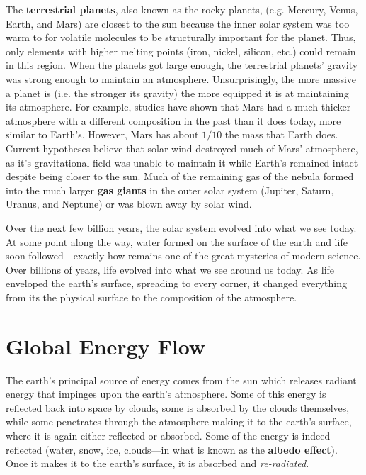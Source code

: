     The \textbf{terrestrial planets}, also known as the rocky planets, (e.g. Mercury, Venus, Earth, and Mars) are closest to the sun because the inner solar system was too warm to for volatile molecules to be structurally important for the planet. Thus, only elements with higher melting points (iron, nickel, silicon, etc.) could remain in this region. When the planets got large enough, the terrestrial planets' gravity was strong enough to maintain an atmosphere. Unsurprisingly, the more massive a planet is (i.e. the stronger its gravity) the more equipped it is at maintaining its atmosphere. For example, studies have shown that Mars had a much thicker atmosphere with a different composition in the past than it does today, more similar to Earth's. However, Mars has about $1/10$ the mass that Earth does. Current hypotheses believe that solar wind destroyed much of Mars' atmosphere, as it's gravitational field was unable to maintain it while Earth's remained intact despite being closer to the sun.\cite{owen1992composition} Much of the remaining gas of the nebula formed into the much larger \textbf{gas giants} in the outer solar system (Jupiter, Saturn, Uranus, and Neptune) or was blown away by solar wind.\cite{hayashi1985formation} 

    Over the next few billion years, the solar system evolved into what we see today. At some point along the way, water formed on the surface of the earth and life soon followed---exactly how remains one of the great mysteries of modern science. Over billions of years, life evolved into what we see around us today.\cite{bell2015potentially} As life enveloped the earth's surface, spreading to every corner, it changed everything from its the physical surface to the composition of the atmosphere.


    \section{\label{sec:energy_flow}Global Energy Flow}

    The earth's principal source of energy comes from the sun which releases radiant energy that impinges upon the earth's atmosphere.  Some of this energy is reflected back into space by clouds, some is absorbed by the clouds themselves, while some penetrates through the atmosphere making it to the earth's surface, where it is again either reflected or absorbed. Some of the energy is indeed reflected (water, snow, ice, clouds---in what is known as the \textbf{albedo effect}). Once it makes it to the earth's surface, it is absorbed and \emph{re-radiated}.

